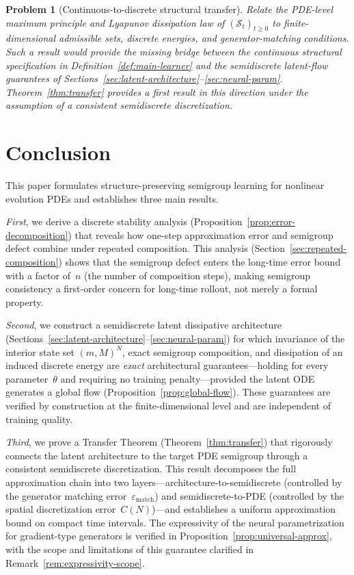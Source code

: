 \documentclass[11pt]{article}
\newtheorem{problem}{Problem}
\newcommand{\cS}{\mathcal{S}}
\begin{document}
\begin{problem}[Continuous-to-discrete structural transfer]
Relate the PDE-level maximum principle and Lyapunov dissipation law of \((\cS_t)_{t\ge 0}\) to finite-dimensional admissible sets, discrete energies, and generator-matching conditions. Such a result would provide the missing bridge between the continuous structural specification in Definition~\ref{def:main-learner} and the semidiscrete latent-flow guarantees of Sections~\ref{sec:latent-architecture}--\ref{sec:neural-param}. Theorem~\ref{thm:transfer} provides a first result in this direction under the assumption of a consistent semidiscrete discretization.
\end{problem}

\section{Conclusion}
This paper formulates structure-preserving semigroup learning for nonlinear evolution PDEs and establishes three main results.

\emph{First}, we derive a discrete stability analysis (Proposition~\ref{prop:error-decomposition}) that reveals how one-step approximation error and semigroup defect combine under repeated composition. This analysis (Section~\ref{sec:repeated-composition}) shows that the semigroup defect enters the long-time error bound with a factor of~$n$ (the number of composition steps), making semigroup consistency a first-order concern for long-time rollout, not merely a formal property.

\emph{Second}, we construct a semidiscrete latent dissipative architecture (Sections~\ref{sec:latent-architecture}--\ref{sec:neural-param}) for which invariance of the interior state set $(m,M)^N$, exact semigroup composition, and dissipation of an induced discrete energy are \emph{exact} architectural guarantees---holding for every parameter~$\theta$ and requiring no training penalty---provided the latent ODE generates a global flow (Proposition~\ref{prop:global-flow}). These guarantees are verified by construction at the finite-dimensional level and are independent of training quality.

\emph{Third}, we prove a Transfer Theorem (Theorem~\ref{thm:transfer}) that rigorously connects the latent architecture to the target PDE semigroup through a consistent semidiscrete discretization. This result decomposes the full approximation chain into two layers---architecture-to-semidiscrete (controlled by the generator matching error~$\varepsilon_{\mathrm{match}}$) and semidiscrete-to-PDE (controlled by the spatial discretization error~$C(N)$)---and establishes a uniform approximation bound on compact time intervals. The expressivity of the neural parametrization for gradient-type generators is verified in Proposition~\ref{prop:universal-approx}, with the scope and limitations of this guarantee clarified in Remark~\ref{rem:expressivity-scope}.
\end{document}
